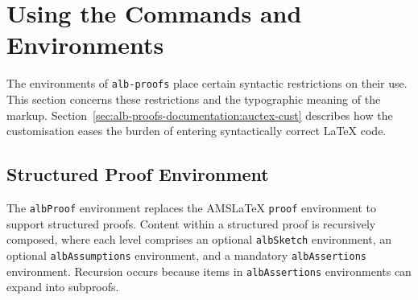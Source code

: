 \documentclass[11pt,a4paper,oneside,titlepage]{alb-latex}
\begin{document}

\section{Using the Commands and Environments}
\label{sec:alb-proofs-documentation:using-comm-envir}

The environments of \texttt{alb-proofs} place certain syntactic
restrictions on their use.  This section concerns these restrictions and
the typographic meaning of the markup.
Section~\ref{sec:alb-proofs-documentation:auctex-cust} describes how the
\AUCTeX{} customisation eases the burden of entering syntactically
correct \LaTeX{} code.



\subsection{Structured Proof Environment}
\label{sec:alb-proofs-documentation:struct-proof-envir}

The \texttt{albProof} environment replaces the AMS\LaTeX{}
\texttt{proof} environment to support structured proofs.  Content within
a structured proof is recursively composed, where each level comprises
an optional \texttt{albSketch} environment, an optional
\texttt{albAssumptions} environment, and a mandatory
\texttt{albAssertions} environment.  Recursion occurs because items in
\texttt{albAssertions} environments can expand into subproofs.
\end{document}
